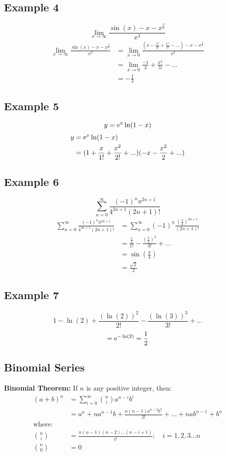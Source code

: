 \documentclass{math}
\begin{document}
\subsection*{Example 4}
\[ \lim_{x\to\infty}\frac{\sin(x)-x-x^{\frac{3}{6}}}{x^{3}} \]
\begin{align*}
  \lim_{x\to\infty}\frac{\sin(x)-x-x^{\frac{3}{6}}}{x^{3}} &=
    \lim_{x\to0}\frac{(x-\frac{x^{3}}{3!}+\frac{x^{5}}{5!}-...)
      -x-x^{\frac{3}{6}}}{x^{3}} \\
  &= \lim_{x\to0}\frac{-1}{3}+\frac{x^{2}}{5!}-... \\
  &= -\frac{1}{3}
\end{align*}

\subsection*{Example 5}
\[ y = \mathrm{e}^{x}\ln(1-x) \]
\begin{align*}
  y &= \mathrm{e}^{x}\ln(1-x) \\
  &= (1+\frac{x}{1!}+\frac{x^{2}}{2!}+...)(-x-\frac{x^{2}}{2}+...)
\end{align*}

\subsection*{Example 6}
\[ \sum_{n=0}^{\infty}\frac{(-1)^{n}\pi^{2n+1}}{4^{2n+1}(2n+1)!} \]
\begin{align*}
  \sum_{n=0}^{\infty}\frac{(-1)^{n}\pi^{2n+1}}{4^{2n+1}(2n+1)!}
    &= \sum_{n=0}^{\infty}(-1)^{n}\frac{(\frac{\pi}{4})^{2n+1}}{(2n+1)!} \\
  &= \frac{\frac{\pi}{4}}{1!}-\frac{(\frac{\pi}{4})^{3}}{3!}+... \\
  &= \sin(\frac{\pi}{4}) \\
  &= \frac{\sqrt{2}}{2}
\end{align*}

\subsection*{Example 7}
\[ 1-\ln(2)+\frac{(\ln(2))^{2}}{2!}-\frac{(\ln(3))^{3}}{3!}+... \]
\[ = \mathrm{e}^{-\ln(2)} = \frac{1}{2} \]

\subsection*{Binomial Series}
\textbf{Binomial Theorem:} If \( n \) is any positive integer, then:
\begin{align*}
  (a+b)^{n} &= \sum_{i=0}^{\infty}\binom{n}{i}a^{n-i}b^{i} \\
  &= a^{n}+na^{n-1}b+\frac{n(n-1)a^{n-2}b^{2}}{2!}+...+nab^{n-1}+b^{n} \\
  \mathrm{where:} \\
  \binom{n}{i} &= \frac{n(n-1)(n-2)...(n-i+1)}{i!}; \quad i=1,2,3...n \\
  \binom{n}{0} &= 0
\end{align*}
\end{document}
